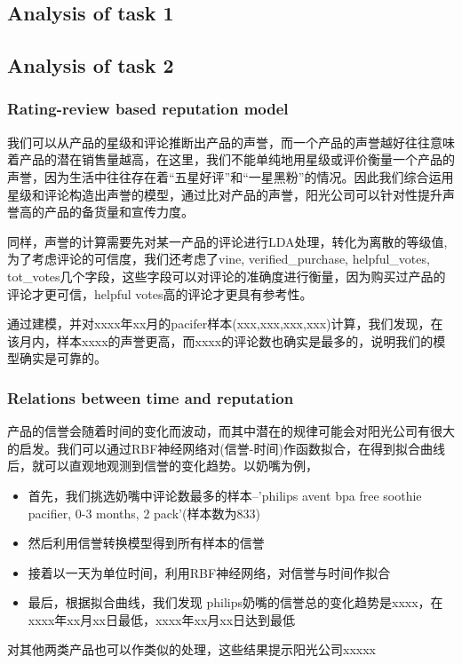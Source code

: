 \documentclass{mcmthesis}
\begin{document}
\subsection{Analysis of task 1}

\subsection{Analysis of task 2}
\subsubsection{Rating-review based reputation model}
我们可以从产品的星级和评论推断出产品的声誉，而一个产品的声誉越好往往意味着产品的潜在销售量越高，在这里，我们不能单纯地用星级或评价衡量一个产品的声誉，因为生活中往往存在着“五星好评”和“一星黑粉”的情况。因此我们综合运用星级和评论构造出声誉的模型，通过比对产品的声誉，阳光公司可以针对性提升声誉高的产品的备货量和宣传力度。

同样，声誉的计算需要先对某一产品的评论进行LDA处理，转化为离散的等级值, 为了考虑评论的可信度，我们还考虑了vine, verified\_purchase, helpful\_votes, tot\_votes几个字段，这些字段可以对评论的准确度进行衡量，因为购买过产品的评论才更可信，helpful votes高的评论才更具有参考性。

通过建模，并对xxxx年xx月的pacifer样本(xxx,xxx,xxx,xxx)计算，我们发现，在该月内，样本xxxx的声誉更高，而xxxx的评论数也确实是最多的，说明我们的模型确实是可靠的。

\subsubsection{Relations between time and reputation}
产品的信誉会随着时间的变化而波动，而其中潜在的规律可能会对阳光公司有很大的启发。我们可以通过RBF神经网络对(信誉-时间)作函数拟合，在得到拟合曲线后，就可以直观地观测到信誉的变化趋势。以奶嘴为例，
\begin{itemize}
	\item 首先，我们挑选奶嘴中评论数最多的样本--'philips avent bpa free soothie pacifier, 0-3 months, 2 pack'(样本数为833)
	\item 然后利用信誉转换模型得到所有样本的信誉
	\item 接着以一天为单位时间，利用RBF神经网络，对信誉与时间作拟合
	\item 最后，根据拟合曲线，我们发现
	philips奶嘴的信誉总的变化趋势是xxxx，在xxxx年xx月xx日最低，xxxx年xx月xx日达到最低
\end{itemize}
对其他两类产品也可以作类似的处理，这些结果提示阳光公司xxxxx
\end{document}
